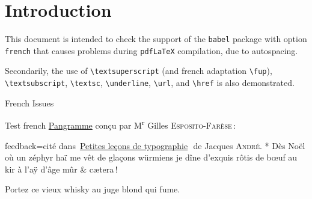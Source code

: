 \documentclass{article}
\def\myquestiontext{ \underline{Pangramme} conçu par Gilles 
  \textsc{Esposito-Farèse}:}
\def\pangramme{Dès Noël où un zéphyr haï me vêt de glaçons würmiens je dîne 
d’exquis rôtis de bœuf au kir à l’aÿ d’âge mûr \& cætera\,!}
\def\myfeedback{cité dans 
  \og\href{https://jacques-andre.fr/faqtypo/lessons.pdf}{Petites 
  leçons de typographie}\fg\ de Jacques \textsc{André}.}
\def\myquestiontext{ \underline{Pangramme} con\c{c}u par M\textsuperscript{r} 
  Gilles \textsc{Esposito-Far\`ese}\,:}
\def\pangramme{D\`es No\"el o\`u un z\'ephyr ha\"i me v\^et de 
gla\c{c}ons w\"urmiens je d\^ine d'exquis r\^otis de b\oe uf au kir \`a l'a\"y 
d'\^age m\^ur \& c\ae tera\,!}
\def\myfeedback{cit\'e dans 
\og\,\href{https://jacques-andre.fr/faqtypo/lessons.pdf}{Petites 
  le\c{c}ons de typographie}\,\fg\ de Jacques \textsc{Andr\'e}.}
\begin{document}
\section*{Introduction}

This document is intended to check the support of the \texttt{babel} package 
with option \texttt{french} that causes problems during \texttt{pdfLaTeX} 
compilation, due to autospacing.

Secondarily, the use of \verb|\textsuperscript| (and french adaptation 
\verb|\fup|), \verb|\textsubscript|, \verb|\textsc|, \verb|\underline|, 
\verb|\url|, and \verb|\href| is also demonstrated.

\begin{quiz}[points=1]{French Issues}
\ifpdftex
  \NoAutoSpacing %
\fi
\begin{multi}[feedback={1\fup{er}, M\fup{me}, N\fup{o}\\
1\textsuperscript{er}, M\textsuperscript{me}, N\textsuperscript{o}\\
H\textsubscript{2}O}]{Test french}
\myquestiontext
\item[feedback={\myfeedback}]* \pangramme
\item Portez ce vieux whisky au juge blond qui fume.
\end{multi}

\end{quiz}
\end{document}
